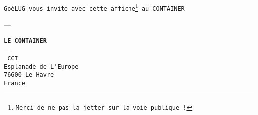 \begin{slide}


\begin{center}
\texttt{GoéLUG vous invite avec cette affiche\footnote{Merci de ne pas la jetter sur la voie publique !} au CONTAINER}

---

\texttt{\textbf{LE CONTAINER}} \\
--- \\
\texttt{
CCI \\
Esplanade de L'Europe \\
76600 Le Havre \\
France
}
\end{center}



\end{slide}